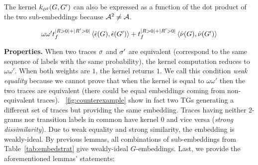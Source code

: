%		
%
%
The kernel $k_{{\phi^{g}}}(G,G')$ can also be expressed as a function of the dot product of the two sub-embeddings because $\mathcal{A}^2\neq\mathcal{A}$.

\vspace*{-3mm}
\begin{equation}\label{eq:corollLem1}
\begin{array}{l}\omega\omega't_f^{|R>0|+|R'>0|}\Braket{\hat{\epsilon}(G), \hat{\epsilon}(G')}+t_f^{|R>0|+|R'>0|}\Braket{\hat{\nu}(G), \hat{\nu}(G')}
\end{array}
\end{equation}

\noindent
\textbf{Properties.}\label{subsub:prop}
When two traces $\sigma$ and ${{\sigma'}}$ are equivalent (correspond to the same sequence of labels with the
same probability), the kernel computation reduces to $\omega\omega'$. When both weights are $1$, the kernel returns $1$.
We call this condition \textit{weak equality} because we cannot prove that when the kernel is equal to $\omega\omega'$ then the two traces are equivalent (there could be equal embeddings coming from non-equivalent traces). \figurename~\ref{fig:counterexample} show in fact two TGs generating a different set of traces but providing the same embedding.
%
Traces having neither $2$-grams nor transition labels in common have kernel $0$ and vice versa (\textit{strong dissimilarity}).
%
Due to weak equality and strong similarity, the embedding is weakly-ideal. {By previous lemmas, all combinations of sub-embeddings from Table~\ref{tab:embedstrat} give weakly-ideal $G$-embeddings.}
%
Last, we provide the aforementioned lemmas' statements:

